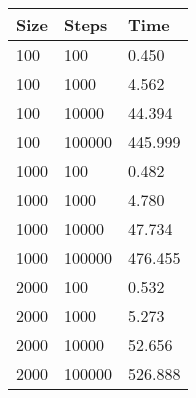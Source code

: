 

\begin{table}[]
\begin{tabular}{lll}
\hline
Size                       & Steps                       & Time                         \\ \hline
\multicolumn{1}{|l}{100}   & 100                         & \multicolumn{1}{l|}{0.450}   \\
\multicolumn{1}{|l}{100}   & 1000                        & \multicolumn{1}{l|}{4.562}   \\
\multicolumn{1}{|l}{100}   & 10000                       & \multicolumn{1}{l|}{44.394}  \\
\multicolumn{1}{|l}{100}   & 100000                      & \multicolumn{1}{l|}{445.999} \\ \hline
\multicolumn{1}{|l|}{1000} & \multicolumn{1}{l|}{100}    & \multicolumn{1}{l|}{0.482}   \\ \hline
\multicolumn{1}{|l|}{1000} & \multicolumn{1}{l|}{1000}   & \multicolumn{1}{l|}{4.780}   \\ \hline
\multicolumn{1}{|l|}{1000} & \multicolumn{1}{l|}{10000}  & \multicolumn{1}{l|}{47.734}  \\ \hline
\multicolumn{1}{|l|}{1000} & \multicolumn{1}{l|}{100000} & \multicolumn{1}{l|}{476.455} \\ \hline
\multicolumn{1}{|l|}{2000} & \multicolumn{1}{l|}{100}    & \multicolumn{1}{l|}{0.532}   \\ \hline
\multicolumn{1}{|l|}{2000} & \multicolumn{1}{l|}{1000}   & \multicolumn{1}{l|}{5.273}   \\ \hline
\multicolumn{1}{|l|}{2000} & \multicolumn{1}{l|}{10000}  & \multicolumn{1}{l|}{52.656}  \\ \hline
2000                       & 100000                      & 526.888                      \\ \hline
\end{tabular}
\end{table}
